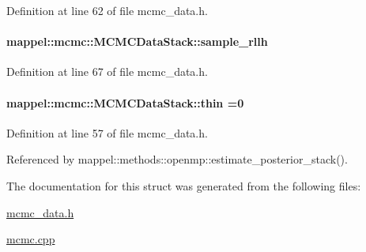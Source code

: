 Definition at line 62 of file mcmc\+\_\+data.\+h.

\paragraph[{\texorpdfstring{sample\+\_\+rllh}{sample_rllh}}]{ mappel\+::mcmc\+::\+M\+C\+M\+C\+Data\+Stack\+::sample\+\_\+rllh}\hypertarget{structmappel_1_1mcmc_1_1MCMCDataStack_a53720538daea5b14876e85f0979feebe}{}\label{structmappel_1_1mcmc_1_1MCMCDataStack_a53720538daea5b14876e85f0979feebe}


Definition at line 67 of file mcmc\+\_\+data.\+h.

\paragraph[{\texorpdfstring{thin}{thin}}]{ mappel\+::mcmc\+::\+M\+C\+M\+C\+Data\+Stack\+::thin =0}\hypertarget{structmappel_1_1mcmc_1_1MCMCDataStack_a94c6756290701c909e3fa9fb3fb43f27}{}\label{structmappel_1_1mcmc_1_1MCMCDataStack_a94c6756290701c909e3fa9fb3fb43f27}


Definition at line 57 of file mcmc\+\_\+data.\+h.



Referenced by mappel\+::methods\+::openmp\+::estimate\+\_\+posterior\+\_\+stack().



The documentation for this struct was generated from the following files\+:\begin{DoxyCompactItemize}
\item 
\hyperlink{mcmc__data_8h}{mcmc\+\_\+data.\+h}\item 
\hyperlink{mcmc_8cpp}{mcmc.\+cpp}\end{DoxyCompactItemize}
